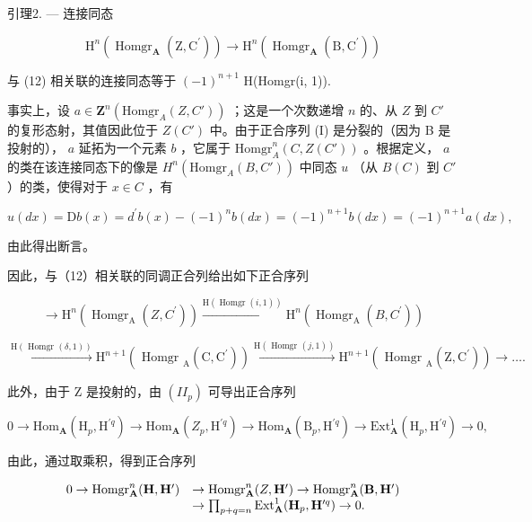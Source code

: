 引理2. --- 连接同态

\[
\mathrm{H} ^ {n} \left(\operatorname{Homgr} _ {\mathbf {A}} \left(\mathrm{Z}, \mathrm{C} ^ {\prime}\right)\right)\rightarrow \mathrm{H} ^ {n} \left(\operatorname{Homgr} _ {\mathbf {A}} \left(\mathrm{B}, \mathrm{C} ^ {\prime}\right)\right)
\]

与 (12) 相关联的连接同态等于 \((-1)^{n+1}\) H(Homgr(i, 1)).

事实上，设 \(a \in \mathbf{Z}^n(\text{Homgr}_A(Z, C'))\) ；这是一个次数递增 \(n\) 的、从 \(Z\) 到 \(C'\) 的复形态射，其值因此位于 \(Z(C')\) 中。由于正合序列 (I) 是分裂的（因为 B 是投射的）， \(a\) 延拓为一个元素 \(b\) ，它属于 \(\text{Homgr}_A^n(C, Z(C'))\) 。根据定义， \(a\) 的类在该连接同态下的像是 \(H^n(\text{Homgr}_A(B, C'))\) 中同态 \(u\) （从 \(B(C)\) 到 \(C'\) ）的类，使得对于 \(x \in C\) ，有

\[
u (d x) = \mathrm{D} b (x) = d ^ {\prime} b (x) - (- 1) ^ {n} b (d x) = (- 1) ^ {n + 1} b (d x) = (- 1) ^ {n + 1} a (d x),
\]

由此得出断言。

因此，与（12）相关联的同调正合列给出如下正合序列

\[
\rightarrow \mathrm{H} ^ {n} (\operatorname{Homgr} _ {\mathrm{A}} (Z, C ^ {\prime})) \xrightarrow {\mathrm{H} (\operatorname{Homgr} (i , 1))} \mathrm{H} ^ {n} (\operatorname{Homgr} _ {\mathrm{A}} (B, C ^ {\prime}))
\]

\[
\xrightarrow {\mathrm{H} (\text { Homgr } (\delta , 1))} \mathrm{H} ^ {n + 1} \left(\text { Homgr } _ {\mathrm{A}} \left(\mathrm{C}, \mathrm{C} ^ {\prime}\right)\right) \xrightarrow {\mathrm{H} (\text { Homgr } (j , 1))} \mathrm{H} ^ {n + 1} \left(\text { Homgr } _ {\mathrm{A}} \left(\mathrm{Z}, \mathrm{C} ^ {\prime}\right)\right)\rightarrow \dots .
\]

此外，由于 Z 是投射的，由 \((II_{p})\) 可导出正合序列

\[
0 \to \mathrm{Hom} _ {\mathbf {A}} (\mathrm{H} _ {p}, \mathrm{H} ^ {\prime q}) \to \mathrm{Hom} _ {\mathbf {A}} (Z _ {p}, \mathrm{H} ^ {\prime q}) \to \mathrm{Hom} _ {\mathbf {A}} (\mathrm{B} _ {p}, \mathrm{H} ^ {\prime q}) \to \mathrm{Ext} _ {\mathbf {A}} ^ {1} (\mathrm{H} _ {p}, \mathrm{H} ^ {\prime q}) \to 0,
\]

由此，通过取乘积，得到正合序列

\[
\begin{array}{r l} 0 \to \operatorname{Homgr} _ {\mathbf {A}} ^ {n} (\mathbf {H}, \mathbf {H} ^ {\prime}) & \to \operatorname{Homgr} _ {\mathbf {A}} ^ {n} (Z, \mathbf {H} ^ {\prime}) \to \operatorname{Homgr} _ {\mathbf {A}} ^ {n} (\mathbf {B}, \mathbf {H} ^ {\prime}) \\ & \to \prod_ {p + q = n} \operatorname{Ext} _ {\mathbf {A}} ^ {1} (\mathbf {H} _ {p}, \mathbf {H} ^ {\prime q}) \to 0. \end{array}
\]

